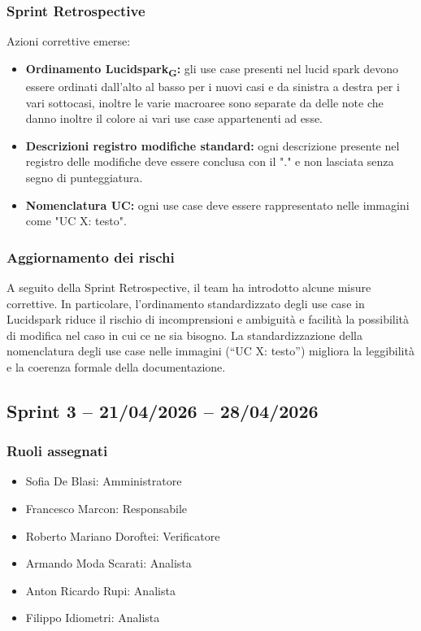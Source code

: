 \subsubsection{Sprint Retrospective}
Azioni correttive emerse:
\begin{itemize}
    \item \textbf{Ordinamento Lucidspark\textsubscript{G}:} gli use case presenti nel lucid spark devono essere ordinati dall'alto
        al basso per i nuovi casi e da sinistra a destra per i vari sottocasi, inoltre le varie macroaree sono separate
        da delle note che danno inoltre il colore ai vari use case appartenenti ad esse.
    \item \textbf{Descrizioni registro modifiche standard:} ogni descrizione presente nel registro delle modifiche 
        deve essere conclusa con il "." e non lasciata senza segno di punteggiatura.
    \item \textbf{Nomenclatura UC:} ogni use case deve essere rappresentato nelle immagini come "UC X: testo".
\end{itemize}

\subsubsection{Aggiornamento dei rischi}
A seguito della Sprint Retrospective, il team ha introdotto alcune misure correttive.
In particolare, l’ordinamento standardizzato degli use case in Lucidspark riduce il rischio 
di incomprensioni e ambiguità e facilità la possibilità di modifica nel caso in cui ce ne sia bisogno.
La standardizzazione della nomenclatura degli use case nelle immagini (“UC X: testo”) migliora 
la leggibilità e la coerenza formale della documentazione.

\subsection{Sprint 3 -- 21/04/2026 -- 28/04/2026}
\label{sec:sprintx}

\subsubsection{Ruoli assegnati}
\begin{itemize}
    \item Sofia De Blasi:  Amministratore
    \item Francesco Marcon:  Responsabile
    \item Roberto Mariano Doroftei:  Verificatore
    \item Armando Moda Scarati:   Analista
    \item Anton Ricardo Rupi:  Analista
    \item Filippo Idiometri:  Analista
\end{itemize}

